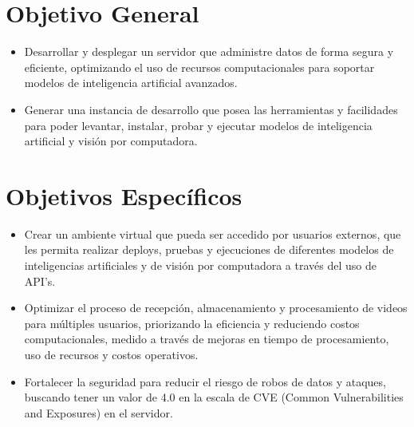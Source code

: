 \section{Objetivo General}
\begin{itemize}
\item Desarrollar y desplegar un servidor que administre datos de forma segura y eficiente, optimizando el uso de recursos computacionales para soportar modelos de inteligencia artificial avanzados. 

\item Generar una instancia de desarrollo que posea las herramientas y facilidades para poder levantar, instalar, probar y ejecutar modelos de inteligencia artificial y visión por computadora.
\end{itemize}

\section{Objetivos Específicos}
\begin{itemize}
\item Crear un ambiente virtual que pueda ser accedido por usuarios externos, que les permita realizar deploys, pruebas y ejecuciones de diferentes modelos de inteligencias artificiales y de visión por computadora a través del uso de API’s.
\item Optimizar el proceso de recepción, almacenamiento y procesamiento de videos para múltiples usuarios, priorizando la eficiencia y reduciendo costos computacionales, medido a través de mejoras en tiempo de procesamiento, uso de recursos y costos operativos.
\item Fortalecer la seguridad para reducir el riesgo de robos de datos y ataques, buscando tener un valor de 4.0 en la escala de CVE (Common Vulnerabilities and Exposures) en el servidor.
\end{itemize}